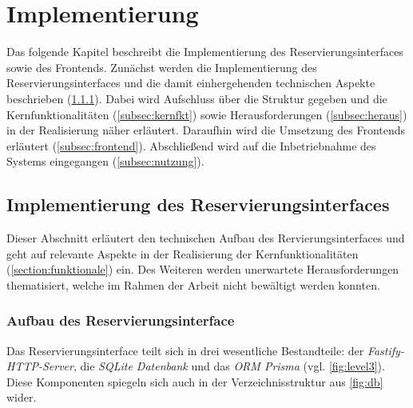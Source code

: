 
\chapter{Implementierung}
\label{chapter-implementierung}
Das folgende Kapitel beschreibt die Implementierung des Reservierungsinterfaces sowie des Frontends.
Zunächst werden die Implementierung des Reservierungsinterfaces und die damit einhergehenden
technischen Aspekte beschrieben (\ref{subsec:aufbauinterface}). Dabei wird Aufschluss über die
Struktur gegeben und die Kernfunktionalitäten (\ref{subsec:kernfkt}) sowie Herausforderungen
(\ref{subsec:heraus}) in der Realisierung näher erläutert. Daraufhin wird die Umsetzung des
Frontends erläutert (\ref{subsec:frontend}). Abschließend wird auf die Inbetriebnahme des Systems
eingegangen (\ref{subsec:nutzung}).

\section{Implementierung des Reservierungsinterfaces}
\label{sec:interface}
Dieser Abschnitt erläutert den technischen Aufbau des Rervierungsinterfaces und geht auf relevante
Aspekte in der Realisierung der Kernfunktionalitäten (\ref{section:funktionale}) ein. Des Weiteren
werden unerwartete Herausforderungen thematisiert, welche im Rahmen der Arbeit nicht bewältigt
werden konnten.

\subsection{Aufbau des Reservierungsinterface}
\label{subsec:aufbauinterface}
Das Reservierungsinterface teilt sich in drei wesentliche Bestandteile: der
\textit{Fastify-HTTP-Server}, die \textit{SQLite Datenbank} und das \textit{ORM
  Prisma} (vgl. \ref{fig:level3}). Diese Komponenten spiegeln sich auch in der
Verzeichnisstruktur aus \ref{fig:db} wider.


